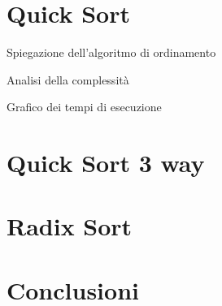 \documentclass[a4paper, 12pt, oneside]{book}
\begin{document}

\chapter{Quick Sort}\label{chap:Quick Sort} %

Spiegazione dell'algoritmo di ordinamento

Analisi della complessità

Grafico dei tempi di esecuzione


\chapter{Quick Sort 3 way}\label{chap:Quick Sort 3 way} %


\chapter{Radix Sort}\label{chap:Radix Sort} %


\chapter{Conclusioni}\label{chap:Conclusioni} %

\end{document}
